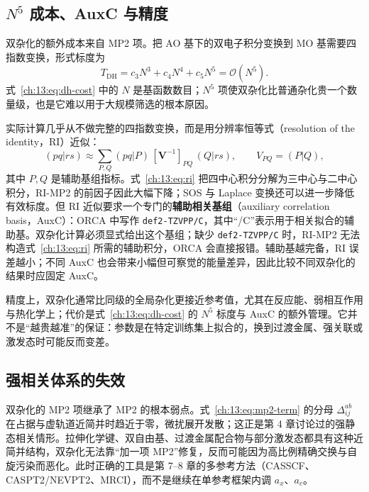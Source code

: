 \subsection{\texorpdfstring{$N^5$}{N5} 成本、AuxC 与精度}
\label{ch:13:sec:cost}

双杂化的额外成本来自 MP2 项。把 AO 基下的双电子积分变换到 MO 基需要四指数变换，形式标度为
\begin{equation}
T_{\mathrm{DH}}
= c_3 N^3 + c_4 N^4 + c_5 N^5
= \mathcal{O}(N^5).
\label{ch:13:eq:dh-cost}
\end{equation}
式~\eqref{ch:13:eq:dh-cost} 中的 $N$ 是基函数数目；$N^5$ 项使双杂化比普通杂化贵一个数量级，也是它难以用于大规模筛选的根本原因。

实际计算几乎从不做完整的四指数变换，而是用分辨率恒等式（resolution of the identity，RI）近似：
\begin{equation}
(pq|rs)
\approx \sum_{P,Q} (pq|P)\,[\mathbf V^{-1}]_{PQ}\,(Q|rs),
\qquad
V_{PQ}=(P|Q),
\label{ch:13:eq:ri}
\end{equation}
其中 $P,Q$ 是辅助基组指标。式~\eqref{ch:13:eq:ri} 把四中心积分分解为三中心与二中心积分，RI-MP2 的前因子因此大幅下降；SOS 与 Laplace 变换还可以进一步降低有效标度。但 RI 近似要求一个专门的\textbf{辅助相关基组}（auxiliary correlation basis，AuxC）：ORCA 中写作 \texttt{def2-TZVPP/C}，其中“/C”表示用于相关拟合的辅助基。双杂化计算必须显式给出这个基组；缺少 \texttt{def2-TZVPP/C} 时，RI-MP2 无法构造式~\eqref{ch:13:eq:ri} 所需的辅助积分，ORCA 会直接报错。辅助基越完备，RI 误差越小；不同 AuxC 也会带来小幅但可察觉的能量差异，因此比较不同双杂化的结果时应固定 AuxC\citep{weigend2006aux,hellweg2007aux}。

精度上，双杂化通常比同级的全局杂化更接近参考值，尤其在反应能、弱相互作用与热化学上；代价是式~\eqref{ch:13:eq:dh-cost} 的 $N^5$ 标度与 AuxC 的额外管理。它并不是“越贵越准”的保证：参数是在特定训练集上拟合的，换到过渡金属、强关联或激发态时可能反而变差。

\subsection{强相关体系的失效}
\label{ch:13:sec:failure}

双杂化的 MP2 项继承了 MP2 的根本弱点。式~\eqref{ch:13:eq:mp2-term} 的分母 $\Delta_{ij}^{ab}$ 在占据与虚轨道近简并时趋近于零，微扰展开发散；这正是第 4 章讨论过的强静态相关情形。拉伸化学键、双自由基、过渡金属配合物与部分激发态都具有这种近简并结构，双杂化无法靠“加一项 MP2”修复，反而可能因为高比例精确交换与自旋污染而恶化。此时正确的工具是第 7--8 章的多参考方法（CASSCF、CASPT2/NEVPT2、MRCI），而不是继续在单参考框架内调 $a_x$、$a_c$。


